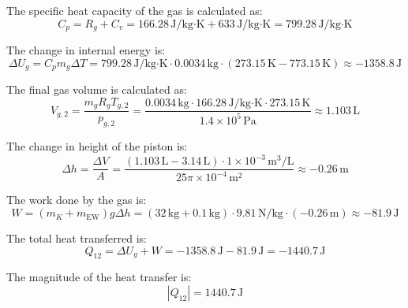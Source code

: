 The specific heat capacity of the gas is calculated as:  
\[
C_p = R_g + C_v = 166.28 \, \text{J/kg·K} + 633 \, \text{J/kg·K} = 799.28 \, \text{J/kg·K}
\]  

The change in internal energy is:  
\[
\Delta U_g = C_p m_g \Delta T = 799.28 \, \text{J/kg·K} \cdot 0.0034 \, \text{kg} \cdot (273.15 \, \text{K} - 773.15 \, \text{K}) \approx -1358.8 \, \text{J}
\]  

The final gas volume is calculated as:  
\[
V_{g,2} = \frac{m_g R_g T_{g,2}}{p_{g,2}} = \frac{0.0034 \, \text{kg} \cdot 166.28 \, \text{J/kg·K} \cdot 273.15 \, \text{K}}{1.4 \times 10^5 \, \text{Pa}} \approx 1.103 \, \text{L}
\]  

The change in height of the piston is:  
\[
\Delta h = \frac{\Delta V}{A} = \frac{(1.103 \, \text{L} - 3.14 \, \text{L}) \cdot 1 \times 10^{-3} \, \text{m}^3/\text{L}}{25 \pi \times 10^{-4} \, \text{m}^2} \approx -0.26 \, \text{m}
\]  

The work done by the gas is:  
\[
W = (m_K + m_{\text{EW}}) g \Delta h = (32 \, \text{kg} + 0.1 \, \text{kg}) \cdot 9.81 \, \text{N/kg} \cdot (-0.26 \, \text{m}) \approx -81.9 \, \text{J}
\]  

The total heat transferred is:  
\[
Q_{12} = \Delta U_g + W = -1358.8 \, \text{J} - 81.9 \, \text{J} = -1440.7 \, \text{J}
\]  

The magnitude of the heat transfer is:  
\[
|Q_{12}| = 1440.7 \, \text{J}
\]